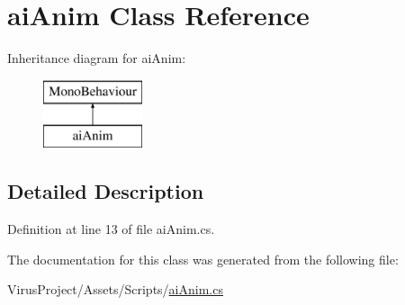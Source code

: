 \hypertarget{classai_anim}{}\section{ai\+Anim Class Reference}
\label{classai_anim}
Inheritance diagram for ai\+Anim\+:\begin{figure}[H]
\begin{center}
\leavevmode
\includegraphics[height=2.000000cm]{classai_anim}
\end{center}
\end{figure}


\subsection{Detailed Description}


Definition at line 13 of file ai\+Anim.\+cs.



The documentation for this class was generated from the following file\+:\begin{DoxyCompactItemize}
\item 
Virus\+Project/\+Assets/\+Scripts/\hyperlink{ai_anim_8cs}{ai\+Anim.\+cs}\end{DoxyCompactItemize}
